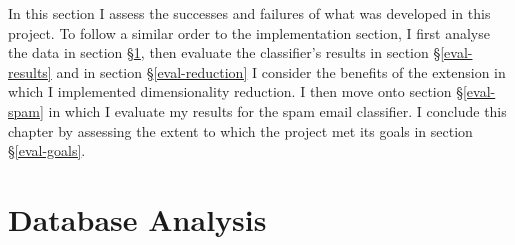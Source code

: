 \documentclass[12pt,a4paper,twoside,openright]{report}
\begin{document}
In this section I assess the successes and failures of what was developed in this project. To follow a similar order to the implementation section, I first analyse the data in section \S\ref{eval-database}, then evaluate the classifier's results in section \S\ref{eval-results} and in section \S\ref{eval-reduction} I consider the benefits of the extension in which I implemented dimensionality reduction. I then move onto section \S\ref{eval-spam} in which I evaluate my results for the spam email classifier. I conclude this chapter by assessing the extent to which the project met its goals in section \S\ref{eval-goals}.

\section{Database Analysis} \label{eval-database}
\end{document}

